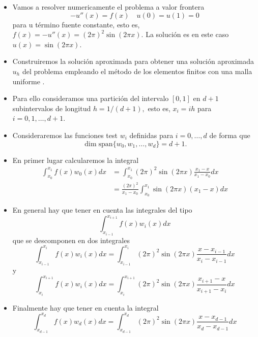 \documentclass[10pt,handout]{beamer}
\theoremstyle{plain} %
\theoremstyle{plain} %
\theoremstyle{plain} %
\theoremstyle{plain} %
\theoremstyle{definition}
\theoremstyle{example}
\theoremstyle{example}
\theoremstyle{remark}
\theoremstyle{remark}
\begin{document}
\begin{frame}
    \begin{itemize}
    \item Vamos a resolver numericamente el problema a valor frontera
    $$
    -u''(x)=f(x) \quad u(0)=u(1)=0
    $$
    para u término fuente constante, esto es, $f(x)=-u''(x)=(2\pi)^2\sin(2\pi x).$ La solución es en este caso $u(x)=\sin(2\pi x).$ 
    \item Construiremos la solución aproximada para obtener una solución aproximada $u_h$ del problema empleando el método de los elementos finitos con una malla uniforme .
    \item Para ello consideramos una partición del intervalo $[0,1]$ en $d+1$ subintervalos de longitud $h=1/(d+1),$ esto es, $x_i=ih$ para $i=0,1,\ldots,d+1.$
\item Consideraremos las funciones test $w_i$ definidas para $i=0,\ldots,d$ de forma que 
$$
\dim \mathrm{span}\{w_0,w_1,\ldots,w_d\} = d+1.
$$
\end{itemize}
\end{frame}


\begin{frame}
    \begin{itemize}
        \item En primer lugar calcularemos la integral
        \begin{align*}
        \int_{x_0}^{x_1} f(x)w_0(x)dx & =\int_{x_0}^{x_1}(2\pi)^2 \sin(2\pi x) \frac{x_1-x}{x_1-x_0}dx \\ 
        &  = \frac{(2\pi)^2}{x_1-x_0}\int_{x_0}^{x_1} \sin(2\pi x) (x_1-x)dx
        \end{align*}
        \item En general hay que tener en cuenta las integrales del tipo
        $$
        \int_{x_{i-1}}^{x_{i+1}}f(x)w_i(x)dx
        $$
        que se descomponen en dos integrales
        $$
        \int_{x_{i-1}}^{x_i} f(x)w_i(x)dx=\int_{x_{i-1}}^{x_{i}}(2\pi)^2 \sin(2\pi x) \frac{x-x_{i-1}}{x_i-x_{i-1}}dx
        $$
        y
        $$
        \int_{x_{i}}^{x_{i+1}} f(x)w_i(x)dx=\int_{x_{i}}^{x_{i+1}}(2\pi)^2 \sin(2\pi x) \frac{x_{i+1}-x}{x_{i+1}-x_{i}}dx
        $$
    \end{itemize}
\end{frame}

\begin{frame}
    \begin{itemize}
        \item Finalmente hay que tener en cuenta la integral
        $$
        \int_{x_{d-1}}^{x_{d}} f(x) w_d(x)dx =\int_{x_{d-1}}^{x_{d}} (2\pi)^2 \sin(2\pi x) \frac{x-x_{d-1}}{x_{d}-x_{d-1}}dx
        $$        
    \end{itemize}
\end{frame}
\end{document}
